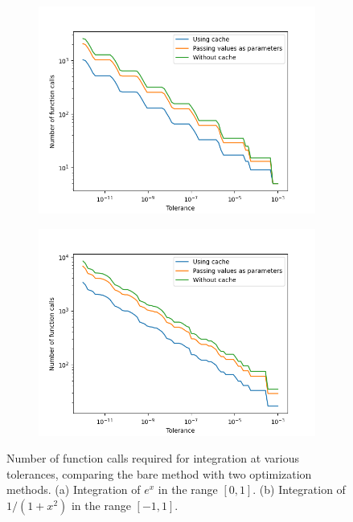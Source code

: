 \documentclass{article}
\begin{document}
\begin{figure}[h!]
\centering
\begin{subfigure}{.5\textwidth}
  \centering
  \includegraphics[width=\linewidth]{images/prob1_exp.png}
  \caption{}
\end{subfigure}%
\begin{subfigure}{.5\textwidth}
  \centering
  \includegraphics[width=\linewidth]{images/prob1_lorentzian.png}
  \caption{}
\end{subfigure}
\caption{Number of function calls required for integration at various tolerances, comparing the bare method with two optimization methods. (a) Integration of $e^x$ in the range $[0, 1]$. (b) Integration of $1/(1 + x^2)$ in the range $[-1, 1]$.}
\label{fig:prob1}
\end{figure}
\newpage
\end{document}
